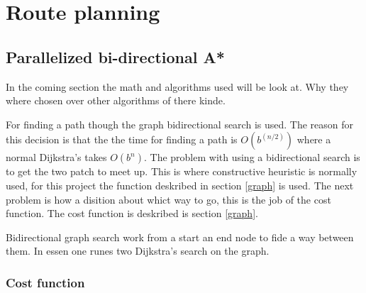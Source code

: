 \section{Route planning}

\subsection{Parallelized bi-directional A*} \label{algorithms}
In the coming section the math and algorithms used will be look at. Why they where chosen over other algorithms of there kinde.

For finding a path though the graph bidirectional search is used. The reason for this decision is that the the time for finding a path is $O(b^{(n/2)})$ where a normal Dijkstra’s takes $O(b^{n})$. The problem with using a bidirectional search is to get the two patch to meet up. This is where constructive heuristic is normally used, for this project the function deskribed in section \ref{graph} is used. The next problem is how a disition about whict way to go, this is the job of the cost function. The cost function is deskribed is section \ref{graph}.

Bidirectional graph search work from a start an end node to fide a way between them. In essen one runes two Dijkstra's search on the graph.

\subsubsection{Cost function}
